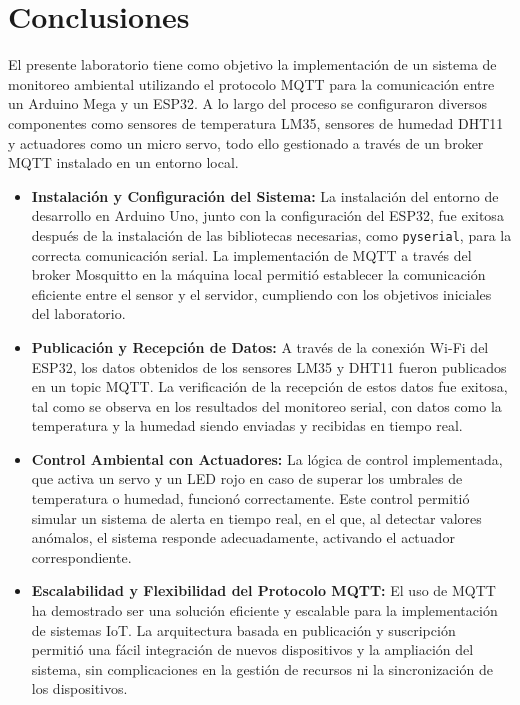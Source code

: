 \section{Conclusiones}

El presente laboratorio tiene como objetivo la implementación de un sistema de monitoreo ambiental utilizando el protocolo MQTT para la comunicación entre un Arduino Mega y un ESP32. A lo largo del proceso se configuraron diversos componentes como sensores de temperatura LM35, sensores de humedad DHT11 y actuadores como un micro servo, todo ello gestionado a través de un broker MQTT instalado en un entorno local.

\begin{itemize}
    \item \textbf{Instalación y Configuración del Sistema:} La instalación del entorno de desarrollo en Arduino Uno, junto con la configuración del ESP32, fue exitosa después de la instalación de las bibliotecas necesarias, como \texttt{pyserial}, para la correcta comunicación serial. La implementación de MQTT a través del broker Mosquitto en la máquina local permitió establecer la comunicación eficiente entre el sensor y el servidor, cumpliendo con los objetivos iniciales del laboratorio.

    \item \textbf{Publicación y Recepción de Datos:} A través de la conexión Wi-Fi del ESP32, los datos obtenidos de los sensores LM35 y DHT11 fueron publicados en un topic MQTT. La verificación de la recepción de estos datos fue exitosa, tal como se observa en los resultados del monitoreo serial, con datos como la temperatura y la humedad siendo enviadas y recibidas en tiempo real.

    \item \textbf{Control Ambiental con Actuadores:} La lógica de control implementada, que activa un servo y un LED rojo en caso de superar los umbrales de temperatura o humedad, funcionó correctamente. Este control permitió simular un sistema de alerta en tiempo real, en el que, al detectar valores anómalos, el sistema responde adecuadamente, activando el actuador correspondiente.

    \item \textbf{Escalabilidad y Flexibilidad del Protocolo MQTT:} El uso de MQTT ha demostrado ser una solución eficiente y escalable para la implementación de sistemas IoT. La arquitectura basada en publicación y suscripción permitió una fácil integración de nuevos dispositivos y la ampliación del sistema, sin complicaciones en la gestión de recursos ni la sincronización de los dispositivos.
    

\end{itemize}
